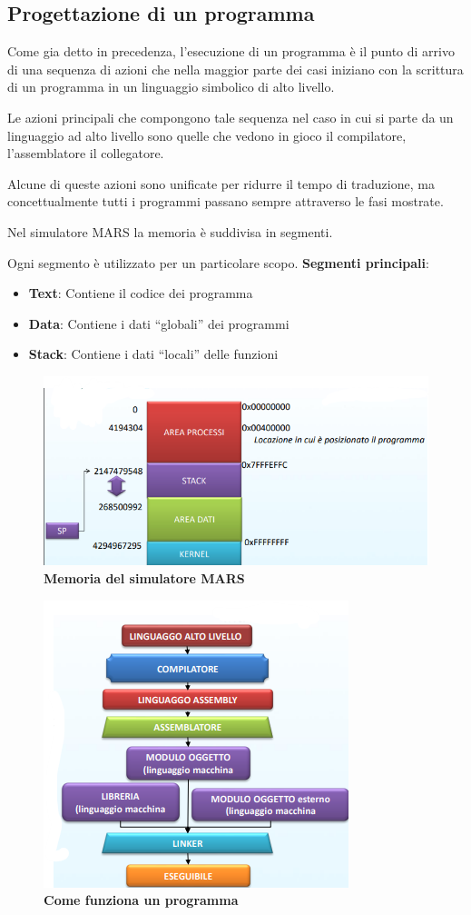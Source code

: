 \documentclass[12pt]{article}
\begin{document}
\subsection{Progettazione di un programma}
Come gia detto in precedenza, l’esecuzione di un programma è il punto di arrivo di una sequenza di azioni che nella maggior parte dei casi iniziano con la scrittura di un programma in un linguaggio simbolico di alto livello.\par\medskip\noindent
Le azioni principali che compongono tale sequenza nel caso in cui si parte da un linguaggio ad alto livello sono quelle che vedono in gioco il compilatore, l’assemblatore il collegatore.\par\medskip\noindent
Alcune di queste azioni sono unificate per ridurre il tempo di traduzione, ma concettualmente tutti i programmi passano sempre attraverso le fasi mostrate.\par\medskip\noindent
Nel simulatore MARS la memoria è suddivisa in segmenti. \par\medskip\noindent Ogni segmento è utilizzato per un particolare scopo. \textbf{Segmenti principali}:
\begin{itemize}
\item  \textbf{Text}: Contiene il codice dei programma 
\item \textbf{Data}: Contiene i dati “globali” dei programmi
\item \textbf{Stack}: Contiene i dati “locali” delle funzioni
\end{itemize}
\begin{figure}[h]
\centering
\includegraphics[width=0.60\linewidth]{mars.png}
\caption{\textbf{Memoria del simulatore MARS}}
\label{fig:enter-label}
\end{figure}
\begin{figure}[h]
\centering
\includegraphics[width=0.50\linewidth]{introduzione.png}
\caption{\textbf{Come funziona un programma}}
\label{fig:enter-label}
\end{figure}
\newpage
\end{document}
